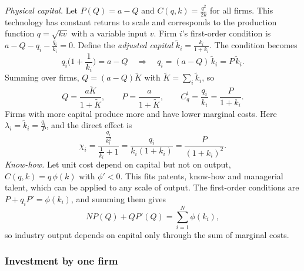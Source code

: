 \begin{example}\label{ex:11-fs-tech}
\emph{Physical capital.} Let $P(Q) = a - Q$ and $C(q, k) = \frac{q^2}{2k}$ for all firms. This technology has
constant returns to scale and corresponds to the production function $q = \sqrt{kv}$ with a variable input $v$.
Firm $i$'s first-order condition is $a - Q - q_i - \frac{q_i}{k_i} = 0$. Define the \emph{adjusted capital}
$\tilde k_i = \frac{k_i}{1 + k_i}$. The condition becomes
\begin{equation*}
q_i\Big(1 + \frac{1}{k_i}\Big) = a - Q
\quad\Longrightarrow\quad
q_i = (a - Q)\,\tilde k_i = P\,\tilde k_i .
\end{equation*}
Summing over firms, $Q = (a - Q)\tilde K$ with $\tilde K = \sum_i \tilde k_i$, so
\begin{equation*}
Q = \frac{a\tilde K}{1 + \tilde K}, \qquad P = \frac{a}{1 + \tilde K}, \qquad
C^i_q = \frac{q_i}{k_i} = \frac{P}{1 + k_i} .
\end{equation*}
Firms with more capital produce more and have lower marginal costs. Here $\lambda_i = \tilde k_i = \frac{q_i}{P}$,
and the direct effect is
\begin{equation*}
\chi_i = \frac{\frac{q_i}{k_i^2}}{\frac{1}{k_i} + 1} = \frac{q_i}{k_i(1 + k_i)} = \frac{P}{(1 + k_i)^2} .
\end{equation*}
\emph{Know-how.} Let unit cost depend on capital but not on output, $C(q, k) = q\,\phi(k)$ with $\phi' < 0$. This
fits patents, know-how and managerial talent, which can be applied to any scale of output. The first-order
conditions are $P + q_i P' = \phi(k_i)$, and summing them gives
\begin{equation}\label{eq:11-fs-knowhow}
N P(Q) + Q P'(Q) = \sum_{i=1}^{N}\phi(k_i),
\end{equation}
so industry output depends on capital only through the sum of marginal costs.
\end{example}

\subsubsection{Investment by one firm}

